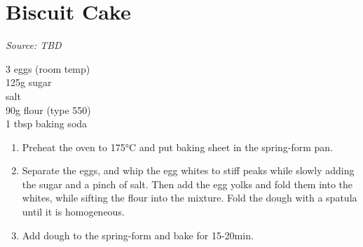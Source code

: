 \documentclass{report}
\begin{document}
\section{Biscuit Cake}
\textit{Source: TBD}\\
\begin{minipage}[t]{0.21\textwidth} \vspace{0pt} 
3 eggs (room temp)\\
125g sugar\\
salt\\
90g flour (type 550)\\
1 tbsp baking soda
\end{minipage}
\hfill
\begin{minipage}[t]{0.78\textwidth} \vspace{0pt}
	\begin{enumerate}
		\item Preheat the oven to 175°C and put baking sheet in the spring-form pan.
		\item Separate the eggs, and whip the egg whites to stiff peaks while slowly adding the sugar and a pinch of salt. Then add the egg yolks and fold them into the whites, while sifting the flour into the mixture. Fold the dough with a spatula until it is homogeneous.
		\item Add dough to the spring-form and bake for 15-20min.
	\end{enumerate}	
\end{minipage}
\end{document}
